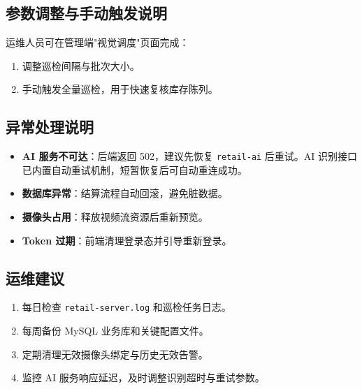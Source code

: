 \subsection{参数调整与手动触发说明}
运维人员可在管理端"视觉调度"页面完成：
\begin{enumerate}[leftmargin=2em]
  \item 调整巡检间隔与批次大小。
  \item 手动触发全量巡检，用于快速复核库存陈列。
\end{enumerate}

\subsection{异常处理说明}
\begin{itemize}[leftmargin=2em]
  \item \textbf{AI 服务不可达}：后端返回 502，建议先恢复 \texttt{retail-ai} 后重试。AI 识别接口已内置自动重试机制，短暂恢复后可自动重连成功。
  \item \textbf{数据库异常}：结算流程自动回滚，避免脏数据。
  \item \textbf{摄像头占用}：释放视频流资源后重新预览。
  \item \textbf{Token 过期}：前端清理登录态并引导重新登录。
\end{itemize}

\subsection{运维建议}
\begin{enumerate}[leftmargin=2em]
  \item 每日检查 \texttt{retail-server.log} 和巡检任务日志。
  \item 每周备份 MySQL 业务库和关键配置文件。
  \item 定期清理无效摄像头绑定与历史无效告警。
  \item 监控 AI 服务响应延迟，及时调整识别超时与重试参数。
\end{enumerate}
